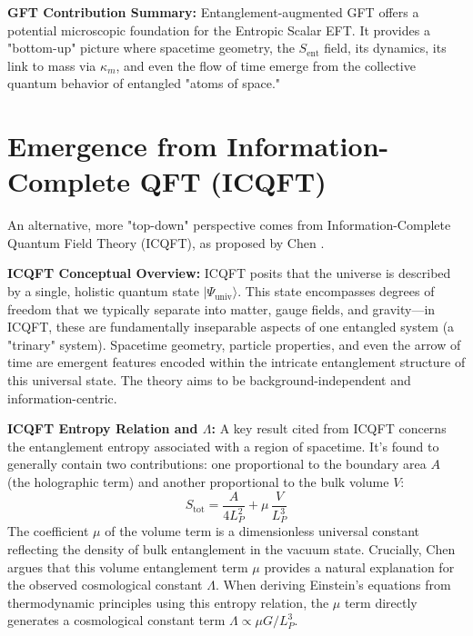\documentclass[11pt]{article}
\begin{document}
\textbf{GFT Contribution Summary:} Entanglement-augmented GFT offers a potential microscopic foundation for the Entropic Scalar EFT. It provides a "bottom-up" picture where spacetime geometry, the $S_{\mathrm{ent}}$ field, its dynamics, its link to mass via $\kappa_m$, and even the flow of time emerge from the collective quantum behavior of entangled "atoms of space."

\section{Emergence from Information-Complete QFT (ICQFT)}

An alternative, more "top-down" perspective comes from Information-Complete Quantum Field Theory (ICQFT), as proposed by Chen \cite{Chen2023}.

\textbf{ICQFT Conceptual Overview:} ICQFT posits that the universe is described by a single, holistic quantum state $|\Psi_{\mathrm{univ}}\rangle$. This state encompasses degrees of freedom that we typically separate into matter, gauge fields, and gravity—in ICQFT, these are fundamentally inseparable aspects of one entangled system (a "trinary" system). Spacetime geometry, particle properties, and even the arrow of time are emergent features encoded within the intricate entanglement structure of this universal state. The theory aims to be background-independent and information-centric.

\textbf{ICQFT Entropy Relation and $\Lambda$:} A key result cited from ICQFT \cite{Chen2023} concerns the entanglement entropy associated with a region of spacetime. It's found to generally contain two contributions: one proportional to the boundary area $A$ (the holographic term) and another proportional to the bulk volume $V$:
\begin{equation*}
S_{\mathrm{tot}} = \frac{A}{4L_P^2} + \mu\,\frac{V}{L_P^3}
\end{equation*}
The coefficient $\mu$ of the volume term is a dimensionless universal constant reflecting the density of bulk entanglement in the vacuum state. Crucially, Chen argues that this volume entanglement term $\mu$ provides a natural explanation for the observed cosmological constant $\Lambda$. When deriving Einstein's equations from thermodynamic principles using this entropy relation, the $\mu$ term directly generates a cosmological constant term $\Lambda \propto \mu G/L_P^3$.
\end{document}
